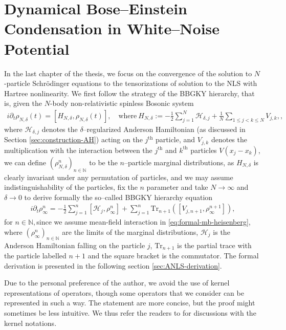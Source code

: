 \chapter{Dynamical Bose--Einstein Condensation in White--Noise Potential}\label{ch:BEC}
In the last chapter of the thesis, we focus on the convergence of the solution
to $N$-particle Schr{\"o}dinger equations to the tensorizations of solution to
the NLS with Hartree nonlinearity. We first follow the strategy of the BBGKY hierarchy, that is, given the $N$-body non-relativistic spinless Bosonic system
\begin{align}\label{eq:formal-mb-heisenberg}
  i \partial_t \rho_{N, \delta} (t) = \left[H_{N, \delta}, \rho_{N, \delta} (t)\right],
  \quad \mathrm{where} \ H_{N, \delta} := - \frac{1}{2} \sum^N_{j = 1}
  \mathcal{H}_{\delta, j} + \frac{1}{N} \sum_{1 \leqslant j < k \leqslant N}
  V_{j, k}, ,
\end{align}
where $\mathcal{H}_{\delta, j}$ denotes the $\delta$--regularized Anderson Hamiltonian (as discussed in Section \ref{sec:construction-AH}) acting on the $j^{\mathrm{th}}$ particle, and $V_{j, k}$ denotes the multiplication with the interaction between the $j^{\mathrm{th}}$ and $k^{\mathrm{th}}$ particles $V(x_j - x_k)$, we can define $(\rho^n_{N, \delta})_{n \in \mathbb{N}}$ to be the $n$--particle marginal distributions, as $H_{N, \delta}$ is clearly invariant under any permutation of particles, and we may
assume indistinguishability of the particles, fix the $n$ parameter and
take $N \rightarrow \infty$ and $\delta \to 0$ to derive formally the so--called BBGKY hierarchy equation
\begin{align}\label{eq:bbgky}
  i \partial_t \rho^n_{\infty} = - \frac{1}{2} \sum_{j = 1}^n
  [\mathcal{H}_{j}, \rho^n_{\infty}] + \sum_{j = 1}^n \mathrm{Tr}_{n + 1}
  \left(\left[V_{j, n + 1}, \rho^{n + 1}_{\infty}\right]\right), 
\end{align}
for $n \in \mathbb{N}, $since we assume mean-field interaction in \eqref{eq:formal-mb-heisenberg},
where $(\rho^n_{\infty})_{n \in \mathbb{N}}$ are the limits of the marginal
distributions, $\mathcal{H}_{j}$ is the Anderson Hamiltonian falling on the
particle $j$, $\mathrm{Tr}_{n + 1}$ is the partial trace with the particle
labelled $n + 1$ and the square bracket is the commutator. The formal derivation is presented in the following section \ref{sec:ANLS-derivation}.

\begin{rem*}Due to the personal preference of the author, we avoid the use of kernel representations of operators, though some operators that we consider can be represented in such a way. The statement are more concise, but the proof might sometimes be less intuitive. We thus refer the readers to \cite{de2025stochastic} for discussions with the kernel notations.  
\end{rem*}

